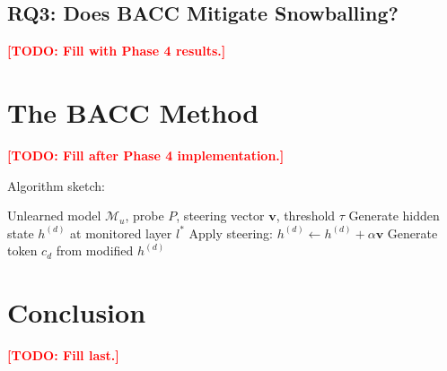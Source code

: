 \documentclass[letterpaper]{article}
\newcommand{\bacc}{\textsc{BACC}}
\newcommand{\TODO}[1]{\textcolor{red}{\textbf{[TODO: #1]}}}
\begin{document}
\subsection{RQ3: Does \bacc{} Mitigate Snowballing?}
\TODO{Fill with Phase 4 results.}

\section{The \bacc{} Method}
\label{sec:bacc}

\TODO{Fill after Phase 4 implementation.}

Algorithm sketch:
\begin{algorithm}
\caption{Boundary-Aware CoT Checkpointing (\bacc{})}
\begin{algorithmic}[1]
\Require Unlearned model $\mathcal{M}_u$, probe $P$, steering vector $\mathbf{v}$, threshold $\tau$
    \State Generate hidden state $h^{(d)}$ at monitored layer $l^*$
      
        \State Apply steering: $h^{(d)} \leftarrow h^{(d)} + \alpha \mathbf{v}$
    \EndIf
    \State Generate token $c_d$ from modified $h^{(d)}$
\EndFor
\end{algorithmic}
\end{algorithm}

\section{Conclusion}
\label{sec:conclusion}

\TODO{Fill last.}



\end{document}
